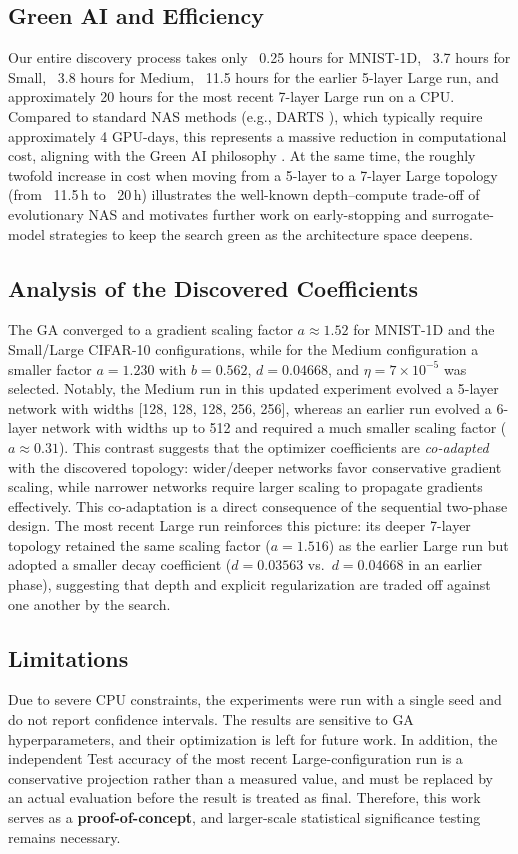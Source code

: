 \documentclass[preprint,12pt,review]{elsarticle}
\begin{document}
\subsection{Green AI and Efficiency}
Our entire discovery process takes only ~0.25 hours for MNIST-1D, ~3.7 hours for Small, ~3.8 hours for Medium, ~11.5 hours for the earlier 5-layer Large run, and approximately 20 hours for the most recent 7-layer Large run on a CPU. Compared to standard NAS methods (e.g., DARTS \cite{ref3}), which typically require approximately 4 GPU-days, this represents a massive reduction in computational cost, aligning with the Green AI philosophy \cite{ref5}. At the same time, the roughly twofold increase in cost when moving from a 5-layer to a 7-layer Large topology (from ~11.5\,h to ~20\,h) illustrates the well-known depth--compute trade-off of evolutionary NAS and motivates further work on early-stopping and surrogate-model strategies to keep the search green as the architecture space deepens.

\subsection{Analysis of the Discovered Coefficients}
The GA converged to a gradient scaling factor \(a \approx 1.52\) for MNIST-1D and the Small/Large CIFAR-10 configurations, while for the Medium configuration a smaller factor \(a = 1.230\) with \(b = 0.562\), \(d = 0.04668\), and \(\eta = 7\times10^{-5}\) was selected. Notably, the Medium run in this updated experiment evolved a 5-layer network with widths [128, 128, 128, 256, 256], whereas an earlier run evolved a 6-layer network with widths up to 512 and required a much smaller scaling factor (\(a \approx 0.31\)). This contrast suggests that the optimizer coefficients are \emph{co-adapted} with the discovered topology: wider/deeper networks favor conservative gradient scaling, while narrower networks require larger scaling to propagate gradients effectively. This co-adaptation is a direct consequence of the sequential two-phase design. The most recent Large run reinforces this picture: its deeper 7-layer topology retained the same scaling factor ($a = 1.516$) as the earlier Large run but adopted a smaller decay coefficient ($d = 0.03563$ vs.\ $d = 0.04668$ in an earlier phase), suggesting that depth and explicit regularization are traded off against one another by the search.

\subsection{Limitations}
Due to severe CPU constraints, the experiments were run with a single seed and do not report confidence intervals. The results are sensitive to GA hyperparameters, and their optimization is left for future work. In addition, the independent Test accuracy of the most recent Large-configuration run is a conservative projection rather than a measured value, and must be replaced by an actual evaluation before the result is treated as final. Therefore, this work serves as a \textbf{proof-of-concept}, and larger-scale statistical significance testing remains necessary.
\end{document}
